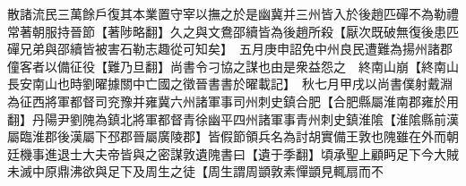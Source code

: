 散諸流民三萬餘戶復其本業置守宰以撫之於是幽冀并三州皆入於後趙匹磾不為勒禮常著朝服持晉節【著陟略翻】久之與文鴦邵續皆為後趙所殺【厭次既破無復後患匹磾兄弟與邵續皆被害石勒志趣從可知矣】　五月庚申詔免中州良民遭難為揚州諸郡僮客者以備征役【難乃旦翻】尚書令刁協之謀也由是衆益怨之　終南山崩【終南山長安南山也時劉曜據關中亡國之徵晉書書於曜載記】　秋七月甲戌以尚書僕射戴淵為征西將軍都督司兖豫并雍冀六州諸軍事司州刺史鎮合肥【合肥縣屬淮南郡雍於用翻】丹陽尹劉隗為鎮北將軍都督青徐幽平四州諸軍事青州刺史鎮淮隂【淮隂縣前漢屬臨淮郡後漢屬下邳郡晉屬廣陵郡】皆假節領兵名為討胡實備王敦也隗雖在外而朝廷機事進退士大夫帝皆與之密謀敦遺隗書曰【遺于季翻】頃承聖上顧眄足下今大賊未滅中原鼎沸欲與足下及周生之徒【周生謂周顗敦素憚顗見輒扇而不